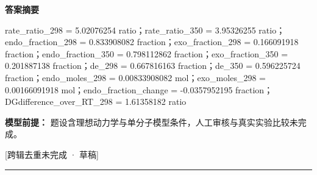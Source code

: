 \documentclass[UTF8,11pt,a4paper]{ctexart}
\begin{document}
\noindent\textbf{答案摘要}\par
rate\_ratio\_298 = 5.02076254 ratio；rate\_ratio\_350 = 3.95326255 ratio；endo\_fraction\_298 = 0.833908082 fraction；exo\_fraction\_298 = 0.166091918 fraction；endo\_fraction\_350 = 0.798112862 fraction；exo\_fraction\_350 = 0.201887138 fraction；de\_298 = 0.667816163 fraction；de\_350 = 0.596225724 fraction；endo\_moles\_298 = 0.00833908082 mol；exo\_moles\_298 = 0.00166091918 mol；endo\_fraction\_change = -0.0357952195 fraction；DGdifference\_over\_RT\_298 = 1.61358182 ratio\par
\noindent\textbf{模型前提：}
题设含理想动力学与单分子模型条件，人工审核与真实实验比较未完成。\par
\noindent\textcolor{red!65!black}{[跨辑去重未完成 · 草稿]} \par
\medskip\hrule\medskip
{}
\end{document}
